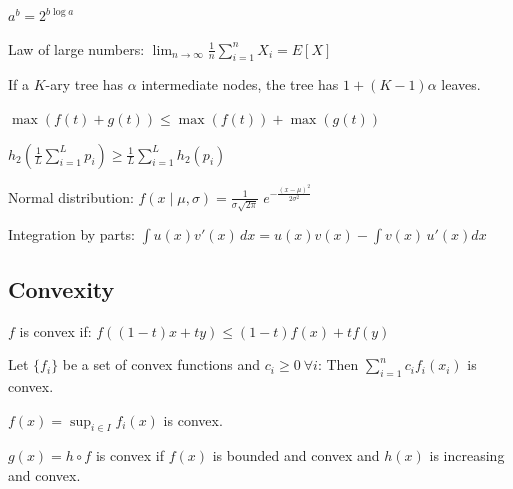\documentclass[10pt,a4paper,landscape]{article}
\begin{document}
\begin{multicols*}{4}
$a^b = 2^{ b \log a}$

Law of large numbers: $\lim_{n \rightarrow \infty} \frac{1}{n} \sum_{i=1}^n X_i = E[X]$

If a $K$-ary tree has $\alpha$ intermediate nodes, the tree has $1+(K-1)\alpha$ leaves.


$\max(f(t) + g(t)) \leq \max(f(t)) + \max(g(t))$


$h_2 \left(\frac{1}{L}\sum_{i=1}^L p_i \right) \geq \frac{1}{L} \sum_{i=1}^L h_2(p_i)$

Normal distribution: $f(x \; | \; \mu, \sigma) = \frac{1}{\sigma\sqrt{2\pi} } \; e^{ -\frac{(x-\mu)^2}{2\sigma^2} }$

Integration by parts: $\int u(x) v'(x) \, dx = u(x) v(x) - \int v(x) \, u'(x)  dx$ 

\subsection{Convexity}

$f$ is convex if: $f((1-t)x+ t y)\leq (1-t) f(x)+ t f(y)$

Let $\{f_i\}$ be a set of convex functions and $c_i \geq 0 \ \forall i$:
Then $\sum_{i=1}^n c_i f_i(x_i)$ is convex.

$f(x) = \sup_{i \in I} f_i(x)$ is convex.

$g(x) = h \circ f$ is convex if $f(x)$ is bounded and convex and $h(x)$ is increasing and convex.
\end{multicols*}
\end{document}
